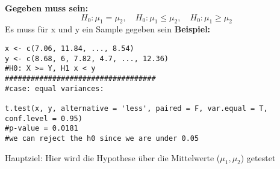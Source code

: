 \large{\textbf{Gegeben muss sein:}}
\[
H_0: \mu_1 = \mu_2, \quad 
H_0: \mu_1 \leq \mu_2, \quad 
H_0: \mu_1 \geq \mu_2
\]
\textcolor{red}{\warning} Es muss für x und y ein Sample gegeben sein \textcolor{red}{\warning}
\large{\textbf{Beispiel:}}
\begin{comment}
\[
\begin{array}{|c|l|}
\hline
\textbf{Symbol} & \textbf{Bedeutung} \\
\hline
n_1,\,n_2 & \text{Stichprobengrößen} \\
\overline{X}_{(n_1)},\,\overline{Y}_{(n_2)} & \text{Sample Means} \\
S^2_{X,n_1},\, S^2_{Y,n_2} & \text{Sample SDs} \\
\hline
\end{array}
\]

\normalsize

\large{\textbf{Pooled Sample Variance:}}
\[
S_p^2 \;=\; 
\dfrac{(n_1 - 1)\,S_{X,n_1}^2 + (n_2 - 1)\,S_{Y,n_2}^2}
{n_1 + n_2 - 2}
\]

\large{\textbf{Teststatistik:}}
\[
T = \dfrac{\overline{X}_{(n_1)} - \overline{Y}_{(n_2)} \;-\; (\mu_1 - \mu_2)}
{S_p\,\sqrt{\dfrac{n_1 + n_2}{n_1\,n_2}}}
\;\;\sim t_{\,n_1 + n_2 - 2}
\]

\large{\textbf{Decision Rule \(R\):}}
\[
T \in R \implies \text{reject } H_0
\]

\large{\textbf{Rejection Region \(R\):}}
\[
\begin{array}{|c|c|}
\hline
H_0 & \text{Rejection Region } R \\ \hline
\mu_1 = \mu_2 
  & (-\infty,\,-t_{n_1+n_2-2,\,1-\tfrac{\alpha}{2}}) \cup (t_{n_1+n_2-2,\,1-\tfrac{\alpha}{2}},\,\infty) \\ \hline
\mu_1 \leq \mu_2 
  & (t_{n_1+n_2-2,\,1-\alpha},\,\infty) \\ \hline
\mu_1 \geq \mu_2 
  & (-\infty,\,-t_{n_1+n_2-2,\,1-\alpha}) \\ \hline
\end{array}
\]
\end{comment}
\begin{lstlisting}
x <- c(7.06, 11.84, ..., 8.54)
y <- c(8.68, 6, 7.82, 4.7, ..., 12.36)
#H0: X >= Y, H1 x < y
###################################
#case: equal variances:

t.test(x, y, alternative = 'less', paired = F, var.equal = T, conf.level = 0.95)
#p-value = 0.0181
#we can reject the h0 since we are under 0.05
\end{lstlisting}
\normalsize
\begin{center}
\end{center}
\normalsize
Hauptziel: Hier wird die Hypothese über die
Mittelwerte ($\mu_1, \mu_2$) getestet
\normalsize
\begin{center}
\end{center}

